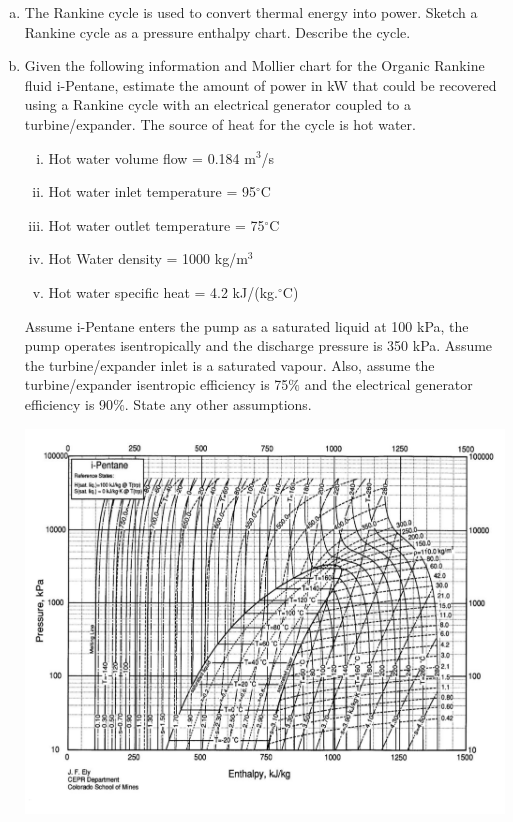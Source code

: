\documentclass[calculator,datasheet,resit]{exam}
\begin{document}
\begin{question}
\begin{enumerate}[(a)]

\item The Rankine cycle is used to convert thermal energy into power. Sketch a Rankine cycle as a pressure enthalpy chart. Describe the cycle.~

\item Given the following information and Mollier chart for the Organic Rankine fluid i-Pentane, estimate the amount of power in kW that could be recovered using a Rankine cycle with an electrical generator coupled to a turbine/expander. The source of heat for the cycle is hot water.
\begin{enumerate}[(i)]
\item Hot water volume  flow = 0.184 m$^{3}$/s
\item Hot water inlet temperature = 95$^{\circ}$C
\item Hot water outlet temperature = 75$^{\circ}$C
\item Hot Water density = 1000 kg/m$^{3}$
\item Hot water specific heat = 4.2 kJ/(kg.$^{\circ}$C)
\end{enumerate}
Assume i-Pentane enters the pump as a saturated liquid at 100 kPa, the pump operates isentropically and the discharge pressure is 350 kPa. Assume the turbine/expander inlet is a saturated vapour. Also, assume the turbine/expander isentropic efficiency is 75$\%$ and the electrical generator efficiency is 90$\%$. State any other assumptions.~
\begin{center}
\includegraphics[width=\columnwidth]{./Pics/EG5597_Process_3_June_2014-5.pdf}
\end{center} 


\end{enumerate}
\end{question}
\end{document}
